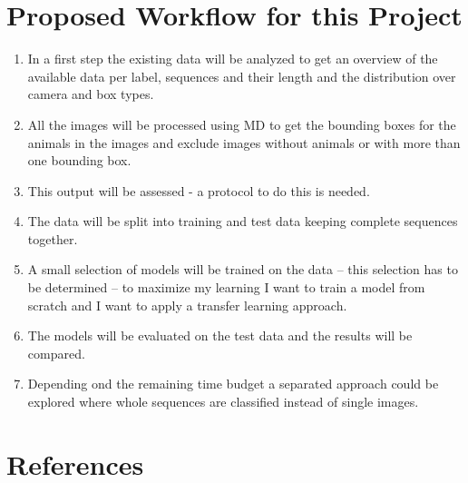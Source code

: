 \documentclass{article}
\begin{document}
\section*{Proposed Workflow for this Project}

\begin{enumerate}
  \item In a first step the existing data will be analyzed to get an overview of the available data per label, sequences and their length and the distribution over camera and box types.
  \item All the images will be processed using MD to get the bounding boxes for the animals in the images and exclude images without animals or with more than one bounding box.
  \item This output will be assessed - a protocol to do this is needed.
  \item The data will be split into training and test data keeping complete sequences together.
  \item A small selection of models will be trained on the data -- this selection has to be determined -- to maximize my learning I want to train a model from scratch and I
  want to apply a transfer learning approach.
  \item The models will be evaluated on the test data and the results will be compared.
  \item Depending ond the remaining time budget a separated approach could be explored where whole sequences are classified instead of single images.
\end{enumerate}

\section*{References}

\printbibliography[heading=none]
\end{document}
